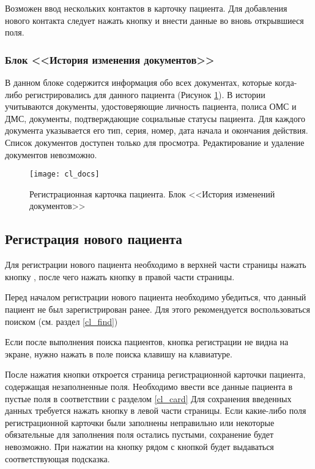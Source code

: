 Возможен ввод нескольких контактов в карточку пациента. Для добавления нового контакта следует нажать кнопку  и внести данные во вновь открывшиеся поля.

\subsubsection{Блок <<История изменения документов>>} \label{cl_docs}

В данном блоке содержится информация обо всех документах, которые когда-либо регистрировались для данного пациента (Рисунок \ref{img_cl_docs}). В истории учитываются документы, удостоверяющие личность пациента, полиса ОМС и ДМС, документы, подтверждающие социальные статусы пациента. Для каждого документа указывается его тип, серия, номер, дата начала и окончания действия. Список документов доступен только для просмотра. Редактирование и удаление документов невозможно. 

\begin{figure}[ht]\centering
 \texttt{[image: cl\_docs]}
 \caption{Регистрационная карточка пациента. Блок <<История изменений документов>>}
 \label{img_cl_docs}
\end{figure} 


\subsection{Регистрация нового пациента} \label{cl_new}

Для регистрации нового пациента необходимо в верхней части страницы нажать кнопку , после чего нажать кнопку   в правой части страницы.

\begin{vnim}
Перед началом регистрации нового пациента необходимо убедиться, что данный пациент не был зарегистрирован ранее. Для этого рекомендуется воспользоваться поиском (см. раздел \ref{cl_find})
\end{vnim}

\begin{vnim}
Если после выполнения поиска пациентов, кнопка регистрации не видна на экране, нужно нажать в поле поиска клавишу  на клавиатуре.
\end{vnim}
 
После нажатия кнопки  откроется страница регистрационной карточки пациента,  содержащая незаполненные поля. Необходимо ввести все данные пациента в пустые поля в соответствии с разделом \ref{cl_card} Для сохранения введенных данных требуется нажать кнопку  в левой части страницы. Если какие-либо поля регистрационной карточки были заполнены неправильно или некоторые обязательные для заполнения поля остались пустыми, сохранение будет невозможно. При нажатии на кнопку  рядом с кнопкой будет выдаваться соответствующая подсказка.

